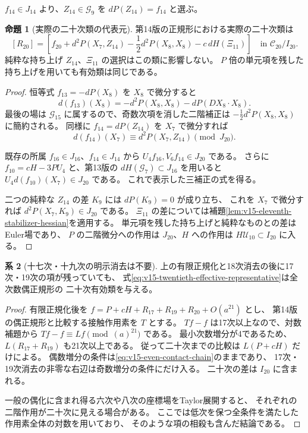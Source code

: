 \documentclass[a4paper,11pt]{ltjsarticle}
\theoremstyle{definition}
\newtheorem{theorem}{命題}[section]
\newtheorem{corollary}[theorem]{系}
\begin{document}
$f_{14}\in J_{14}$ より、$Z_{14}\in\mathcal G_9$ を
$dP(Z_{14})=f_{14}$ と選ぶ。

\begin{theorem}[実際の二十次類の代表元]
\label{thm:v15-twentieth-effective-representative}
第14版の正規形における実際の二十次類は
\begin{equation}\label{eq:v15-twentieth-effective-representative}
 \boxed{\displaystyle
 [R_{20}]=\left[f_{20}+d^2P(X_7,Z_{14})
       -\frac12d^2P(X_8,X_8)-c\,dH(\Xi_{11})\right]
       \quad\text{in }\mathcal C_{20}/I_{20}.
 }
\end{equation}
純粋な持ち上げ $Z_{14}$、$\Xi_{11}$ の選択はこの類に影響しない。
$P$ 倍の単元項を残した持ち上げを用いても有効類は同じである。
\end{theorem}

\begin{proof}
恒等式 $f_{13}=-dP(X_8)$ を $X_8$ で微分すると
\[
 d(f_{13})(X_8)=-d^2P(X_8,X_8)-dP(DX_8\cdot X_8).
\]
最後の場は $\mathcal G_{15}$ に属するので、奇数次項を消した二階補正は
$-\tfrac12d^2P(X_8,X_8)$ に簡約される。
同様に $f_{14}=dP(Z_{14})$ を $X_7$ で微分すれば
\[
 d(f_{14})(X_7)\equiv d^2P(X_7,Z_{14})\pmod{J_{20}}.
\]

既存の所属 $f_{16}\in J_{16}$、$f_{14}\in J_{14}$ から
$U_4f_{16},V_6f_{14}\in J_{20}$ である。
さらに $f_{10}=cH-3PU_4$ と、第13版の
$dH(\mathcal G_7)\subset J_{16}$ を用いると
$U_4d(f_{10})(X_7)\in J_{20}$ である。
これで表示した三補正の式を得る。

二つの純粋な $Z_{14}$ の差 $K_9$ には $dP(K_9)=0$ が成り立ち、
これを $X_7$ で微分すれば $d^2P(X_7,K_9)\in J_{20}$ である。
$\Xi_{11}$ の差については補題\ref{lem:v15-eleventh-stabilizer-hessian}を適用する。
単元項を残した持ち上げと純粋なものとの差はEuler場であり、
$P$ の二階微分への作用は $J_{20}$、$H$ への作用は
$H\mathcal U_{10}\subset I_{20}$ に入る。
\end{proof}

\begin{corollary}[十七次・十九次の明示消去は不要]
\label{cor:v15-twentieth-without-odd-normalizers}
上の有限正規化と18次消去の後に17次・19次の項が残っていても、
式\eqref{eq:v15-twentieth-effective-representative}は全次数偶正規形の
二十次有効類を与える。
\end{corollary}

\begin{proof}
有限正規化後を $f=P+cH+R_{17}+R_{19}+R_{20}+O(a^{21})$ とし、
第14版の偶正規形と比較する接触作用素を $T$ とする。
$Tf-f$ は17次以上なので、対数補題から
$Tf-f\equiv Lf\pmod{(a)^{21}}$ である。
最小次数増分が4であるため、$L(R_{17}+R_{19})$ も21次以上である。
従って二十次までの比較は $L(P+cH)$ だけによる。
偶数増分の条件は\eqref{eq:v15-even-contact-chain}のままであり、
17次・19次消去の非零な右辺は奇数増分の条件にだけ入る。
二十次の差は $I_{20}$ に含まれる。

一般の偶化に含まれ得る六次や八次の座標場をTaylor展開すると、
それぞれの二階作用が二十次に見える場合がある。
ここでは低次を保つ全条件を満たした作用素全体の対数を用いており、
そのような項の相殺も含んだ結論である。
\end{proof}
\end{document}
